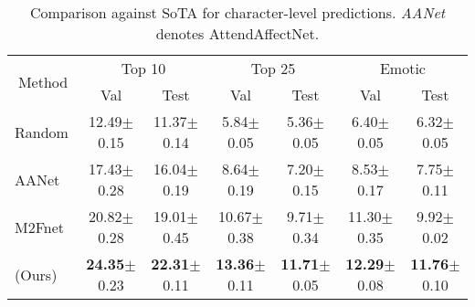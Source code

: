 \begin{table*}[t]
\centering
\tabcolsep=0.09cm
\begin{tabular}{l cc cc cc}
\toprule
\multicolumn{1}{c}{\multirow{2}{*}{Method}} & \multicolumn{2}{c}{Top 10}      & \multicolumn{2}{c}{Top 25}      & \multicolumn{2}{c}{Emotic}      \\
\multicolumn{1}{c}{} & Val   & Test  & Val   & Test & Val   & Test \\
\midrule
Random
& 12.49\scriptsize{{$\pm$}0.15} & 11.37\scriptsize{{$\pm$}0.14} & 5.84\scriptsize{{$\pm$}0.05} & 5.36\scriptsize{{$\pm$}0.05} & 6.40\scriptsize{{$\pm$}0.05} & 6.32\scriptsize{{$\pm$}0.05} \\
AANet~\cite{attendaffectnet}
& 17.43\scriptsize{{$\pm$}0.28} & 16.04\scriptsize{{$\pm$}0.19} & 8.64\scriptsize{{$\pm$}0.19} & 7.20\scriptsize{{$\pm$}0.15} & 8.53\scriptsize{{$\pm$}0.17} & 7.75\scriptsize{{$\pm$}0.11} \\
M2Fnet~\cite{m2fnet}
& 20.82\scriptsize{{$\pm$}0.28} & 19.01\scriptsize{{$\pm$}0.45} & 10.67\scriptsize{{$\pm$}0.38}  & 9.71\scriptsize{{$\pm$}0.34} & 11.30\scriptsize{{$\pm$}0.35}  & 9.92\scriptsize{{$\pm$}0.02} \\
\midrule
\modelname{} (Ours)
& \textbf{24.35}\scriptsize{{$\pm$}0.23} & \textbf{22.31}\scriptsize{{$\pm$}0.11} & \textbf{13.36}\scriptsize{{$\pm$}0.11} & \textbf{11.71}\scriptsize{{$\pm$}0.05} & \textbf{12.29}\scriptsize{{$\pm$}0.08} & \textbf{11.76}\scriptsize{{$\pm$}0.10} \\ \bottomrule
\end{tabular}
\vspace{-2mm}
\caption{Comparison against SoTA for character-level predictions. \emph{AANet} denotes AttendAffectNet.}
\label{tab:char_sota_abl}
\end{table*}
